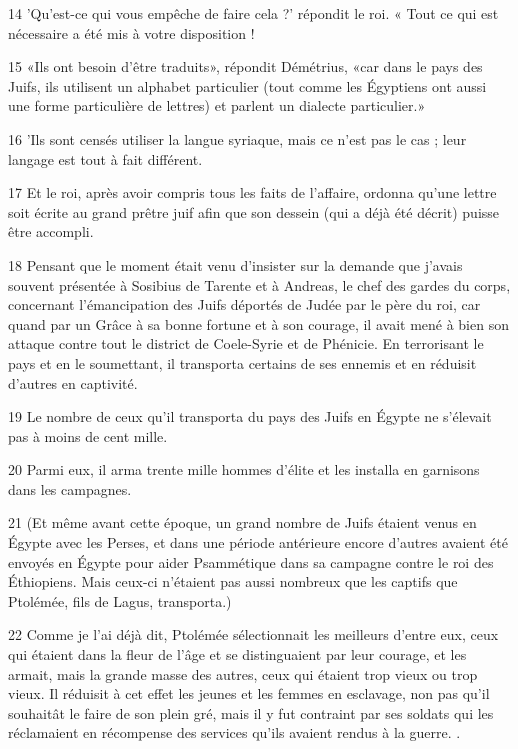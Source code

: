 \par 14 'Qu'est-ce qui vous empêche de faire cela ?' répondit le roi. « Tout ce qui est nécessaire a été mis à votre disposition !

\par 15 «Ils ont besoin d'être traduits», répondit Démétrius, «car dans le pays des Juifs, ils utilisent un alphabet particulier (tout comme les Égyptiens ont aussi une forme particulière de lettres) et parlent un dialecte particulier.»

\par 16 'Ils sont censés utiliser la langue syriaque, mais ce n'est pas le cas ; leur langage est tout à fait différent.

\par 17 Et le roi, après avoir compris tous les faits de l'affaire, ordonna qu'une lettre soit écrite au grand prêtre juif afin que son dessein (qui a déjà été décrit) puisse être accompli.

\par 18 Pensant que le moment était venu d'insister sur la demande que j'avais souvent présentée à Sosibius de Tarente et à Andreas, le chef des gardes du corps, concernant l'émancipation des Juifs déportés de Judée par le père du roi, car quand par un Grâce à sa bonne fortune et à son courage, il avait mené à bien son attaque contre tout le district de Coele-Syrie et de Phénicie. En terrorisant le pays et en le soumettant, il transporta certains de ses ennemis et en réduisit d'autres en captivité.

\par 19 Le nombre de ceux qu'il transporta du pays des Juifs en Égypte ne s'élevait pas à moins de cent mille.

\par 20 Parmi eux, il arma trente mille hommes d'élite et les installa en garnisons dans les campagnes.

\par 21 (Et même avant cette époque, un grand nombre de Juifs étaient venus en Égypte avec les Perses, et dans une période antérieure encore d'autres avaient été envoyés en Égypte pour aider Psammétique dans sa campagne contre le roi des Éthiopiens. Mais ceux-ci n'étaient pas aussi nombreux que les captifs que Ptolémée, fils de Lagus, transporta.)

\par 22 Comme je l'ai déjà dit, Ptolémée sélectionnait les meilleurs d'entre eux, ceux qui étaient dans la fleur de l'âge et se distinguaient par leur courage, et les armait, mais la grande masse des autres, ceux qui étaient trop vieux ou trop vieux. Il réduisit à cet effet les jeunes et les femmes en esclavage, non pas qu'il souhaitât le faire de son plein gré, mais il y fut contraint par ses soldats qui les réclamaient en récompense des services qu'ils avaient rendus à la guerre. .

